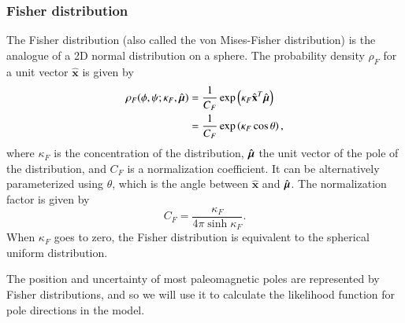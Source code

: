 \documentclass[preprint,12pt,authoryear]{elsarticle}
\newcommand{\mitbf}[1]{\hbox{\mathversion{bold}$#1$}}
\begin{document}
\subsubsection{Fisher distribution}
The Fisher distribution (also called the von Mises-Fisher distribution) is the analogue
of a 2D normal distribution on a sphere.
The probability density $\rho_F$ for a unit vector $\hat{\mathbf{x}}$ is given by
\begin{equation}
  \begin{aligned}
  \rho_F(\phi, \psi ; \kappa_F, \hat{\mitbf{\mu}}) 
  &= \frac{1}{C_F} \exp \left( \kappa_F \hat{\mathbf{x}}^T \hat{\mitbf{\mu}} \right) \\
  &= \frac{1}{C_F} \exp \left( \kappa_F \cos \theta \right),
  \end{aligned}
\end{equation}
where $\kappa_F$ is the concentration of the distribution, 
$\hat{\mitbf{\mu}}$ the unit vector of the pole of the distribution, 
and $C_F$ is a normalization coefficient. It can be alternatively
parameterized using $\theta$, which is the angle between $\hat{\mathbf{x}}$ and $\hat{\mitbf{\mu}}$.
The normalization factor is given by 
\begin{equation}
  C_F = \frac{\kappa_F}{4 \pi \sinh{\kappa_F}}.
\end{equation}
When $\kappa_F$ goes to zero, the Fisher distribution is equivalent to the spherical uniform distribution.

The position and uncertainty of most paleomagnetic poles are represented by Fisher distributions,
and so we will use it to calculate the likelihood function for pole directions in the model.
\end{document}
